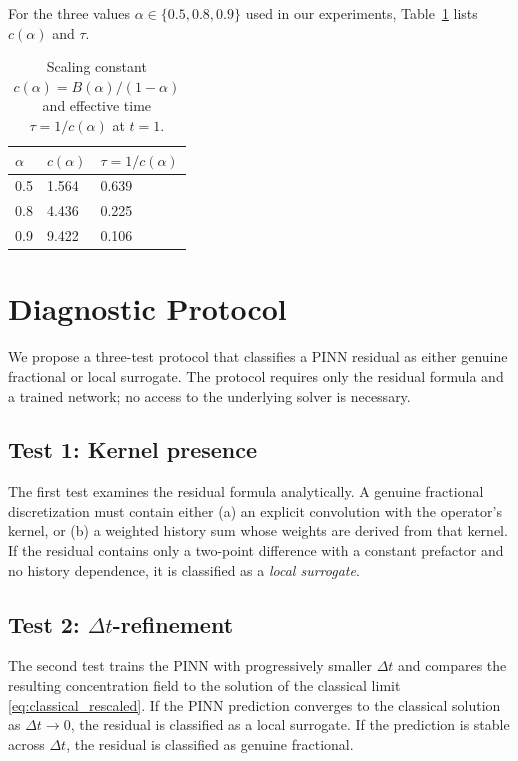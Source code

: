 \documentclass[11pt]{article}
\begin{document}
For the three values \(\alpha \in \{0.5, 0.8, 0.9\}\) used in our experiments, Table~\ref{tab:tau} lists \(c(\alpha)\) and \(\tau\).

\begin{table}[h]
\centering
\caption{Scaling constant \(c(\alpha) = B(\alpha)/(1-\alpha)\) and effective time \(\tau = 1/c(\alpha)\) at \(t=1\).}
\label{tab:tau}
\begin{tabular}{lll}
\toprule
\(\alpha\) & \(c(\alpha)\) & \(\tau = 1/c(\alpha)\) \\
\midrule
0.5 & 1.564 & 0.639 \\
0.8 & 4.436 & 0.225 \\
0.9 & 9.422 & 0.106 \\
\bottomrule
\end{tabular}
\end{table}

\section{Diagnostic Protocol}
\label{sec:protocol}

We propose a three-test protocol that classifies a PINN residual as either genuine fractional or local surrogate. The protocol requires only the residual formula and a trained network; no access to the underlying solver is necessary.

\subsection{Test 1: Kernel presence}

The first test examines the residual formula analytically. A genuine fractional discretization must contain either (a) an explicit convolution with the operator's kernel, or (b) a weighted history sum whose weights are derived from that kernel. If the residual contains only a two-point difference with a constant prefactor and no history dependence, it is classified as a \emph{local surrogate}.

\subsection{Test 2: \(\Delta t\)-refinement}
\label{sec:dt_refinement}

The second test trains the PINN with progressively smaller \(\Delta t\) and compares the resulting concentration field to the solution of the classical limit \eqref{eq:classical_rescaled}. If the PINN prediction converges to the classical solution as \(\Delta t\to 0\), the residual is classified as a local surrogate. If the prediction is stable across \(\Delta t\), the residual is classified as genuine fractional.
\end{document}
